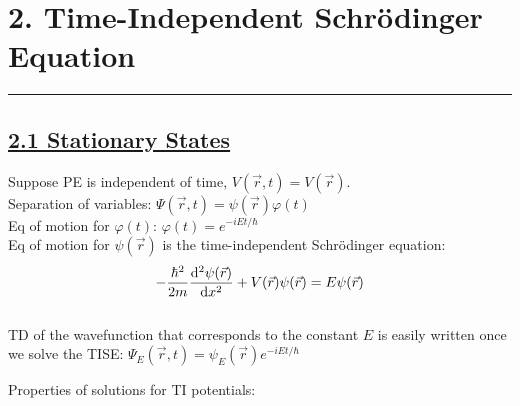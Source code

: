 \section{2. Time-Independent Schr\"{o}dinger Equation} \hrule height 0.3pt \thinspace

\subsection{\underline{2.1 Stationary States}}
Suppose PE is independent of time, $V(\vec{r}, t) = V(\vec{r})$. \\
Separation of variables: $\Psi(\vec{r}, t) = \psi(\vec{r}) \varphi(t)$ \\

Eq of motion for $\varphi(t)$: $\varphi(t) = e^{-iEt/\hbar}$ \\

Eq of motion for $\psi(\vec{r})$ is the time-independent Schr\"{o}dinger equation:
$$-\frac{\hbar^2 }{2m} \dv[2]{\psi(\vec{r})}{x} + V(\vec{r}) \psi(\vec{r}) = E \psi(\vec{r}) $$ \\

TD of the wavefunction that corresponds to the constant $E$ is easily written once we solve the TISE: $\Psi_{E}(\vec{r}, t) = \psi_{E}(\vec{r}) e^{-iEt / \hbar}$ \\

\medskip

Properties of solutions for TI potentials: \\

